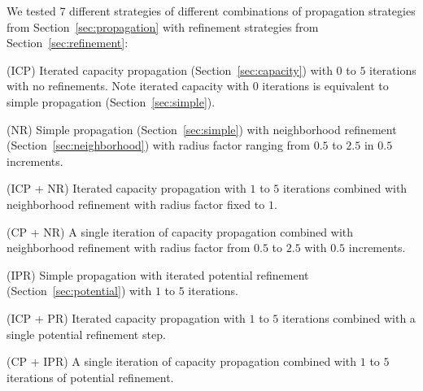 \documentclass[twoside,11pt]{article}
\begin{document}
\vspace{-0.2in}
We tested 7 different strategies of different combinations of propagation
strategies from Section~\ref{sec:propagation} with refinement strategies from
Section~\ref{sec:refinement}:
\begin{compactenum}
  \item (ICP) Iterated capacity propagation (Section~\ref{sec:capacity}) with
    $0$ to $5$ iterations with no refinements. Note iterated capacity with $0$
    iterations is equivalent to simple propagation (Section~\ref{sec:simple}).
  \item (NR) Simple propagation (Section~\ref{sec:simple}) with neighborhood
    refinement (Section~\ref{sec:neighborhood}) with radius factor ranging from
    $0.5$ to $2.5$ in $0.5$ increments.
  \item (ICP + NR) Iterated capacity propagation with $1$ to $5$ iterations
    combined with neighborhood refinement with radius factor fixed to $1$.
  \item (CP + NR) A single iteration of capacity propagation combined with
    neighborhood refinement with radius factor from $0.5$ to $2.5$ with $0.5$
    increments.
  \item (IPR) Simple propagation with iterated potential refinement
    (Section~\ref{sec:potential}) with $1$ to $5$ iterations.  
  \item (ICP + PR) Iterated capacity propagation with $1$ to $5$ iterations
    combined with a single potential refinement step.
  \item (CP + IPR) A single iteration of capacity propagation combined with
    $1$ to $5$ iterations of potential refinement.
\end{compactenum}
\end{document}
